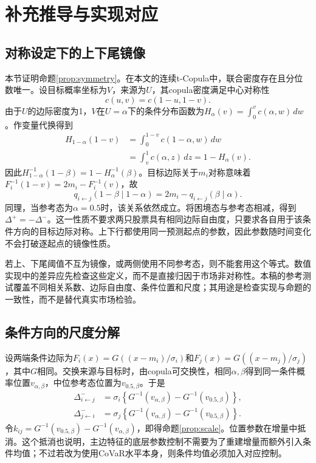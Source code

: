 \chapter{补充推导与实现对应}
\section{对称设定下的上下尾镜像}
本节证明命题\ref{prop:symmetry}。在本文的连续t-Copula中，联合密度存在且分位数唯一。设目标概率坐标为$V$，来源为$U$，其copula密度满足中心对称性
\begin{equation}
c(u,v)=c(1-u,1-v).
\end{equation}
由于$U$的边际密度为1，$V$在$U=\alpha$下的条件分布函数为$H_{\alpha}(v)=\int_0^v c(\alpha,w)\,dw$。作变量代换得到
\begin{align}
H_{1-\alpha}(1-v)
&=\int_0^{1-v}c(1-\alpha,w)\,dw\\
&=\int_v^1c(\alpha,z)\,dz
=1-H_{\alpha}(v).
\end{align}
因此$H_{1-\alpha}^{-1}(1-\beta)=1-H_{\alpha}^{-1}(\beta)$。目标边际关于$m_i$对称意味着$F_i^{-1}(1-v)=2m_i-F_i^{-1}(v)$，故
\begin{equation}
q_{i\leftarrow j}(1-\beta\mid1-\alpha)=2m_i-q_{i\leftarrow j}(\beta\mid\alpha).
\end{equation}
同理，当参考态为$\alpha=0.5$时，该关系依然成立。将困境态与参考态相减，得到$\Delta^+=-\Delta^-$。这一性质不要求两只股票具有相同边际自由度，只要求各自用于该条件方向的目标边际对称。上下行都使用同一预测起点的参数，因此参数随时间变化不会打破逐起点的镜像性质。

若上、下尾阈值不互为镜像，或两侧使用不同参考态，则不能套用这个等式。数值实现中的差异应先检查这些定义，而不是直接归因于市场非对称性。本稿的参考测试覆盖不同相关系数、边际自由度、条件位置和尺度；其用途是检查实现与命题的一致性，而不是替代真实市场检验。

\section{条件方向的尺度分解}
设两端条件边际为$F_i(x)=G((x-m_i)/\sigma_i)$和$F_j(x)=G((x-m_j)/\sigma_j)$，其中$G$相同。交换来源与目标时，由copula可交换性，相同$\alpha,\beta$得到同一条件概率位置$v_{\alpha,\beta}$，中位参考态位置为$v_{0.5,\beta}$。于是
\begin{align}
\Delta^-_{i\leftarrow j}
&=\sigma_i\left\{G^{-1}(v_{\alpha,\beta})-G^{-1}(v_{0.5,\beta})\right\},\\
\Delta^-_{j\leftarrow i}
&=\sigma_j\left\{G^{-1}(v_{\alpha,\beta})-G^{-1}(v_{0.5,\beta})\right\}.
\end{align}
令$k_{ij}=G^{-1}(v_{0.5,\beta})-G^{-1}(v_{\alpha,\beta})$，即得命题\ref{prop:scale}。位置参数在增量中抵消。这个抵消也说明，主边特征的底层参数控制不需要为了重建增量而额外引入条件均值；不过若改为使用CoVaR水平本身，则条件均值必须加入对应控制。

